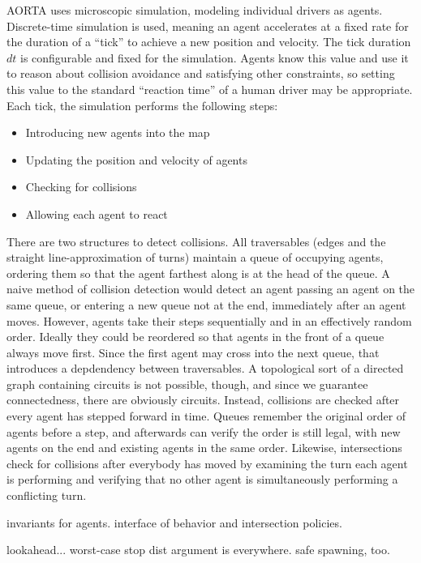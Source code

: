 \documentclass[12pt]{article}
\begin{document}
AORTA uses microscopic simulation, modeling individual drivers as agents.
Discrete-time simulation is used, meaning an agent accelerates at a fixed rate
for the duration of a ``tick'' to achieve a new position and velocity. The tick
duration $dt$ is configurable and fixed for the simulation. Agents know this
value and use it to reason about collision avoidance and satisfying other
constraints, so setting this value to the standard ``reaction time'' of a human
driver may be appropriate. Each tick, the simulation performs the following
steps:
\begin{itemize}
  \item Introducing new agents into the map
  \item Updating the position and velocity of agents
  \item Checking for collisions
  \item Allowing each agent to react
\end{itemize}

There are two structures to detect collisions. All traversables (edges and the
straight line-approximation of turns) maintain a queue of occupying agents,
ordering them so that the agent farthest along is at the head of the queue.
A naive method of collision detection would detect an agent passing an agent on
the same queue, or entering a new queue not at the end, immediately after an
agent moves. However, agents take their steps sequentially and in an effectively
random order. Ideally they could be reordered so that agents in the front of a
queue always move first. Since the first agent may cross into the next queue,
that introduces a depdendency between traversables. A topological sort of a
directed graph containing circuits is not possible, though, and since we
guarantee connectedness, there are obviously circuits. Instead, collisions are
checked after every agent has stepped forward in time. Queues remember the
original order of agents before a step, and afterwards can verify the order is
still legal, with new agents on the end and existing agents in the same order.
Likewise, intersections check for collisions after everybody has moved by
examining the turn each agent is performing and verifying that no other agent is
simultaneously performing a conflicting turn.



invariants for agents. interface of behavior and intersection policies.

lookahead... worst-case stop dist argument is everywhere. safe spawning, too.
\end{document}
